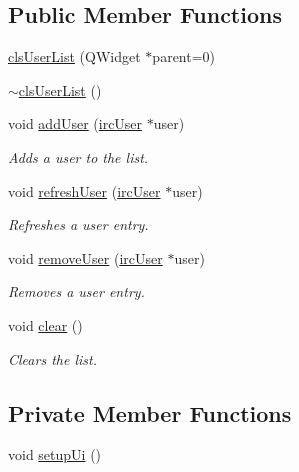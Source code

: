\subsection*{Public Member Functions}
\begin{DoxyCompactItemize}
\item 
\hyperlink{classclient_1_1cls_user_list_a91105ec3b18c4e62607146ba2aa7d72d}{cls\-User\-List} (Q\-Widget $\ast$parent=0)
\item 
\hyperlink{classclient_1_1cls_user_list_a58e37bcc6f3dfa03b57661ab3fc2e8c8}{$\sim$cls\-User\-List} ()
\item 
void \hyperlink{classclient_1_1cls_user_list_adf012bc4b8c266961028b5114619b8c2}{add\-User} (\hyperlink{classclient_1_1irc_user}{irc\-User} $\ast$user)
\begin{DoxyCompactList}\small\item\em Adds a user to the list. \end{DoxyCompactList}\item 
void \hyperlink{classclient_1_1cls_user_list_a545fe682c9cc507698703a5d7f3e25a4}{refresh\-User} (\hyperlink{classclient_1_1irc_user}{irc\-User} $\ast$user)
\begin{DoxyCompactList}\small\item\em Refreshes a user entry. \end{DoxyCompactList}\item 
void \hyperlink{classclient_1_1cls_user_list_a1557093786f442bf1314bf763800445b}{remove\-User} (\hyperlink{classclient_1_1irc_user}{irc\-User} $\ast$user)
\begin{DoxyCompactList}\small\item\em Removes a user entry. \end{DoxyCompactList}\item 
void \hyperlink{classclient_1_1cls_user_list_acb1c07e842f8cba8fe04e41d672f1d07}{clear} ()
\begin{DoxyCompactList}\small\item\em Clears the list. \end{DoxyCompactList}\end{DoxyCompactItemize}
\subsection*{Private Member Functions}
\begin{DoxyCompactItemize}
\item 
void \hyperlink{classclient_1_1cls_user_list_aca5601b1e79a265ddc203dbdf8c5c868}{setup\-Ui} ()
\end{DoxyCompactItemize}

